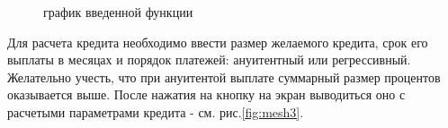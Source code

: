\documentclass[10pt, letterpaper, final]{article}
\begin{document}
\begin{figure}[H]
   \caption{график введенной функции}
   \label{fig:mesh2}
\end{figure}

\newpage
Для расчета кредита необходимо ввести размер желаемого кредита, срок его выплаты в месяцах и порядок платежей: ануитентный или регрессивный. Желательно учесть, что при ануитентой выплате суммарный размер процентов оказывается выше. После нажатия на кнопку на экран выводиться оно с расчетыми параметрами кредита - см. рис.\ref{fig:mesh3}.
\end{document}
